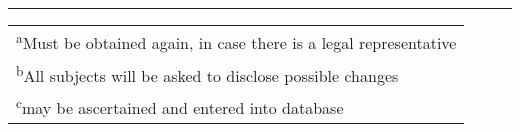 \begin{table}[]
\bigskip
\rule{4cm}{0.4pt}

\begin{tabular}{l}
\footnotesize{\textsuperscript{a}Must be obtained again, in case there is a legal representative} \\
\footnotesize{\textsuperscript{b}All subjects will be asked to disclose possible changes} \\
\footnotesize{\textsuperscript{c}may be ascertained and entered into database} \\
\end{tabular}
\end{table}

